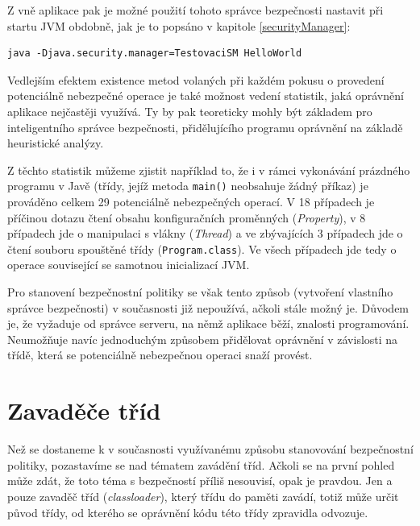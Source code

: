 Z vně aplikace pak je možné použití tohoto správce bezpečnosti nastavit při startu JVM obdobně, jak je to popsáno v kapitole \ref{securityManager}:

\begin{lstlisting}[caption=Spuštění aplikace se správcem bezpečnosti, label=runWithSM]
java -Djava.security.manager=TestovaciSM HelloWorld
\end{lstlisting}

Vedlejším efektem existence metod volaných při každém pokusu o provedení potenciálně nebezpečné operace je také možnost vedení statistik, jaká oprávnění
aplikace nejčastěji využívá. Ty by pak teoreticky mohly být základem pro inteligentního správce bezpečnosti, přidělujícího programu oprávnění
na základě heuristické analýzy.

Z těchto statistik můžeme zjistit například to, že i v rámci vykonávání prázdného programu v Javě (třídy, jejíž metoda {\tt main()} neobsahuje žádný příkaz) je prováděno celkem 29 potenciálně nebezpečných operací.
V 18 případech je příčinou dotazu čtení obsahu konfiguračních proměnných ({\it Property}), v 8 případech jde o manipulaci s vlákny ({\it Thread}) a ve zbývajících 3 případech jde o čtení souboru spouštěné třídy ({\tt Program.class}). Ve všech případech jde tedy o operace související se samotnou inicializací JVM.

Pro stanovení bezpečnostní politiky se však tento způsob (vytvoření vlastního správce bezpečnosti) v současnosti již nepoužívá, ačkoli stále možný je.
Důvodem je, že vyžaduje od správce serveru, na němž aplikace běží, znalosti programování.
Neumožňuje navíc jednoduchým způsobem přidělovat oprávnění v závislosti na třídě, která se potenciálně nebezpečnou operaci snaží provést.

\section{Zavaděče tříd} \label{classloader}

Než se dostaneme k v současnosti využívanému způsobu stanovování bezpečnostní politiky, pozastavíme se nad tématem zavádění tříd.
Ačkoli se na první pohled může zdát, že toto téma s bezpečností příliš nesouvisí, opak je pravdou.
Jen a pouze zavaděč tříd ({\it classloader}), který třídu do paměti zavádí, totiž může určit původ třídy, od kterého se oprávnění kódu této třídy zpravidla odvozuje.

